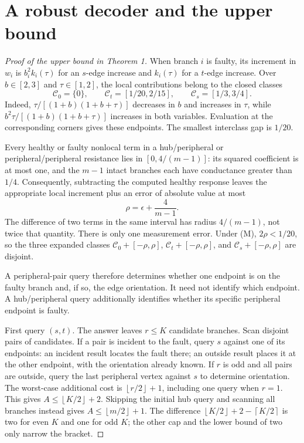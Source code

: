 \documentclass[11pt,letterpaper]{article}
\newcommand{\ceil}[1]{\left\lceil #1\right\rceil}
\newcommand{\floor}[1]{\left\lfloor #1\right\rfloor}
\begin{document}
\section{A robust decoder and the upper bound}
\begin{proof}[Proof of the upper bound in Theorem 1]
When branch $i$ is faulty, its increment in $w_i$ is $b_i^2k_i(\tau)$ for an $s$-edge increase and $k_i(\tau)$ for a $t$-edge increase. Over $b\in[2,3]$ and $\tau\in[1,2]$, the local contributions belong to the closed classes
\[
 \mathcal C_0=\{0\},\qquad \mathcal C_t=[1/20,2/15],\qquad
 \mathcal C_s=[1/3,3/4].
\]
Indeed, $\tau/[(1+b)(1+b+\tau)]$ decreases in $b$ and increases in $\tau$, while $b^2\tau/[(1+b)(1+b+\tau)]$ increases in both variables. Evaluation at the corresponding corners gives these endpoints. The smallest interclass gap is $1/20$.

Every healthy or faulty nonlocal term in a hub/peripheral or peripheral/peripheral resistance lies in $[0,4/(m-1)]$: its squared coefficient is at most one, and the $m-1$ intact branches each have conductance greater than $1/4$. Consequently, subtracting the computed healthy response leaves the appropriate local increment plus an error of absolute value at most
\[
 \rho=\epsilon+\frac4{m-1}.
\]
The difference of two terms in the same interval has radius $4/(m-1)$, not twice that quantity. There is only one measurement error. Under (M), $2\rho<1/20$, so the three expanded classes $\mathcal C_0+[-\rho,\rho]$, $\mathcal C_t+[-\rho,\rho]$, and $\mathcal C_s+[-\rho,\rho]$ are disjoint.

A peripheral-pair query therefore determines whether one endpoint is on the faulty branch and, if so, the edge orientation. It need not identify which endpoint. A hub/peripheral query additionally identifies whether its specific peripheral endpoint is faulty.

First query $(s,t)$. The answer leaves $r\le K$ candidate branches. Scan disjoint pairs of candidates. If a pair is incident to the fault, query $s$ against one of its endpoints: an incident result locates the fault there; an outside result places it at the other endpoint, with the orientation already known. If $r$ is odd and all pairs are outside, query the last peripheral vertex against $s$ to determine orientation. The worst-case additional cost is $\floor{r/2}+1$, including one query when $r=1$. This gives $A\le\floor{K/2}+2$. Skipping the initial hub query and scanning all branches instead gives $A\le\floor{m/2}+1$. The difference $\floor{K/2}+2-\ceil{K/2}$ is two for even $K$ and one for odd $K$; the other cap and the lower bound of two only narrow the bracket.
\end{proof}
\end{document}
